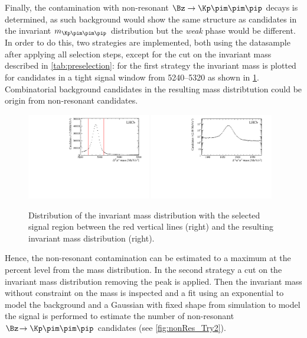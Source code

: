 Finally, the contamination with non-resonant $\Bz\to\Kp\pim\pim\pip$ decays is determined, as such background would show the same structure as \BdToDpi candidates in the invariant $m_{\Kp\pim\pim\pip}$ distribution but the \emph{weak} phase would be different.
In order to do this, two strategies are implemented, both using the datasample after applying all selection steps, except for the cut on the invariant \Dm mass described in \cref{tab:preselection}:
for the first strategy the invariant \Dm mass is plotted for candidates in a tight \Bz signal window from \SIrange[per-mode=symbol]{5240}{5320}{\MeVcc} as shown in \cref{fig:nonRes_Try1}.
Combinatorial background candidates in the resulting \Dm mass distribtution could be origin from non-resonant \Kpm\pimp\pimp\pipm candidates.
\begin{figure}[tb]
    \centering
    \includegraphics[width=0.48\textwidth]{06selection/figs/BmassCut.pdf}
    \includegraphics[width=0.48\textwidth]{06selection/figs/Resulting_Dmass.pdf}
    \caption{Distribution of the invariant \Bz mass distribution with the selected signal region between the red vertical lines (right) and the resulting invariant \Dm mass distribution (right).}
    \label{fig:nonRes_Try1}
\end{figure}
Hence, the non-resonant contamination can be estimated to a maximum at the percent level from the \Dm mass distribution.
In the second strategy a cut on the invariant \Dm mass distribution removing the \Dm peak is applied.
Then the invariant \Bz mass without constraint on the \Dm mass is inspected and a fit using an exponential to model the background and a Gaussian with fixed shape from simulation to model the signal is performed to estimate the number of non-resonant $\Bz\!\to\Kp\pim\pim\pip$ candidates (see \cref{fig:nonRes_Try2}).
